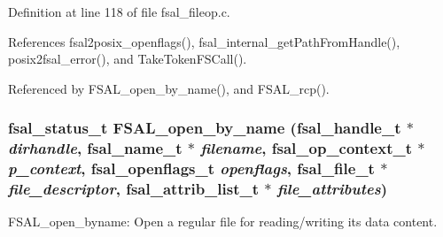 Definition at line 118 of file fsal\_\-fileop.c.

References fsal2posix\_\-openflags(), fsal\_\-internal\_\-get\-Path\-From\-Handle(), posix2fsal\_\-error(), and Take\-Token\-FSCall().

Referenced by FSAL\_\-open\_\-by\_\-name(), and FSAL\_\-rcp().
\subsubsection{\setlength{\rightskip}{0pt plus 5cm}fsal\_\-status\_\-t FSAL\_\-open\_\-by\_\-name (fsal\_\-handle\_\-t $\ast$ {\em dirhandle}, fsal\_\-name\_\-t $\ast$ {\em filename}, fsal\_\-op\_\-context\_\-t $\ast$ {\em p\_\-context}, fsal\_\-openflags\_\-t {\em openflags}, fsal\_\-file\_\-t $\ast$ {\em file\_\-descriptor}, fsal\_\-attrib\_\-list\_\-t $\ast$ {\em file\_\-attributes})}\label{fsal__fileop_8c_a0}


FSAL\_\-open\_\-byname: Open a regular file for reading/writing its data content.

